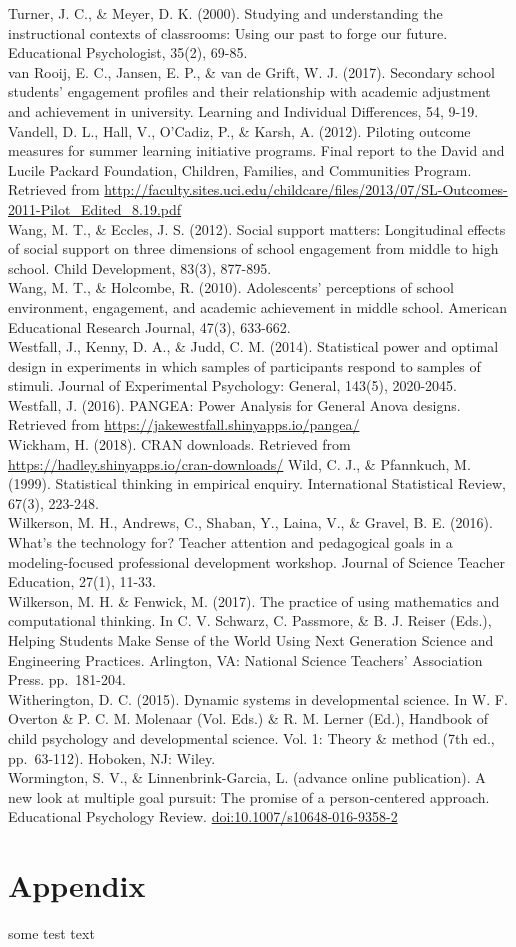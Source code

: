 \documentclass[]{msu-thesis}
\theoremstyle{definition}
\theoremstyle{definition}
\theoremstyle{definition}
\theoremstyle{remark}
\begin{document}
Turner, J. C., \& Meyer, D. K. (2000). Studying and understanding the
instructional contexts of classrooms: Using our past to forge our
future. Educational Psychologist, 35(2), 69-85.\\
van Rooij, E. C., Jansen, E. P., \& van de Grift, W. J. (2017).
Secondary school students' engagement profiles and their relationship
with academic adjustment and achievement in university. Learning and
Individual Differences, 54, 9-19.\\
Vandell, D. L., Hall, V., O'Cadiz, P., \& Karsh, A. (2012). Piloting
outcome measures for summer learning initiative programs. Final report
to the David and Lucile Packard Foundation, Children, Families, and
Communities Program. Retrieved from
\url{http://faculty.sites.uci.edu/childcare/files/2013/07/SL-Outcomes-2011-Pilot_Edited_8.19.pdf}\\
Wang, M. T., \& Eccles, J. S. (2012). Social support matters:
Longitudinal effects of social support on three dimensions of school
engagement from middle to high school. Child Development, 83(3),
877-895.\\
Wang, M. T., \& Holcombe, R. (2010). Adolescents' perceptions of school
environment, engagement, and academic achievement in middle school.
American Educational Research Journal, 47(3), 633-662.\\
Westfall, J., Kenny, D. A., \& Judd, C. M. (2014). Statistical power and
optimal design in experiments in which samples of participants respond
to samples of stimuli. Journal of Experimental Psychology: General,
143(5), 2020-2045.\\
Westfall, J. (2016). PANGEA: Power Analysis for General Anova designs.
Retrieved from \url{https://jakewestfall.shinyapps.io/pangea/}\\
Wickham, H. (2018). CRAN downloads. Retrieved from
\url{https://hadley.shinyapps.io/cran-downloads/} Wild, C. J., \&
Pfannkuch, M. (1999). Statistical thinking in empirical enquiry.
International Statistical Review, 67(3), 223-248.\\
Wilkerson, M. H., Andrews, C., Shaban, Y., Laina, V., \& Gravel, B. E.
(2016). What's the technology for? Teacher attention and pedagogical
goals in a modeling-focused professional development workshop. Journal
of Science Teacher Education, 27(1), 11-33.\\
Wilkerson, M. H. \& Fenwick, M. (2017). The practice of using
mathematics and computational thinking. In C. V. Schwarz, C. Passmore,
\& B. J. Reiser (Eds.), Helping Students Make Sense of the World Using
Next Generation Science and Engineering Practices. Arlington, VA:
National Science Teachers' Association Press. pp.~181-204.\\
Witherington, D. C. (2015). Dynamic systems in developmental science. In
W. F. Overton \& P. C. M. Molenaar (Vol. Eds.) \& R. M. Lerner (Ed.),
Handbook of child psychology and developmental science. Vol. 1: Theory
\& method (7th ed., pp.~63-112). Hoboken, NJ: Wiley.\\
Wormington, S. V., \& Linnenbrink-Garcia, L. (advance online
publication). A new look at multiple goal pursuit: The promise of a
person-centered approach. Educational Psychology Review.
\url{doi:10.1007/s10648-016-9358-2}

\chapter{Appendix}\label{appendix}

some test text


\end{document}
